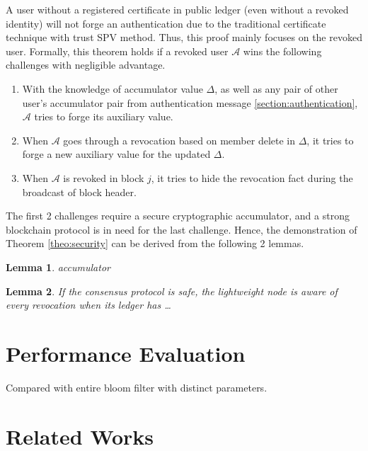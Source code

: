 \documentclass[conference]{IEEEtran}
\newtheorem{lemma}{Lemma}[theorem]
\begin{document}
\begin{IEEEproof}
    A user without a registered certificate in public ledger (even without a revoked identity) will not forge an authentication due to the traditional certificate technique with trust SPV method. Thus, this proof mainly focuses on the revoked user. Formally, this theorem holds if a revoked user $\mathcal{A}$ wins the following challenges with negligible advantage.
    \begin{enumerate}
        \item With the knowledge of accumulator value $\Delta$, as well as any pair of other user's accumulator pair from authentication message \ref{section:authentication}, $\mathcal{A}$ tries to forge its auxiliary value.
        \item When $\mathcal{A}$ goes through a revocation based on member delete in $\Delta$, it tries to forge a new auxiliary value for the updated $\Delta$.
        \item When $\mathcal{A}$ is revoked in block $j$, it tries to hide the revocation fact during the broadcast of block header.
    \end{enumerate}

    The first 2 challenges require a secure cryptographic accumulator, and a strong blockchain protocol is in need for the last challenge. Hence, the demonstration of Theorem \ref{theo:security} can be derived from the following 2 lemmas.
\end{IEEEproof}
\begin{lemma}
    accumulator
\end{lemma}

\begin{lemma}
    If the consensus protocol is safe, the lightweight node is aware of every revocation when its ledger has \dots
\end{lemma}

\section{Performance Evaluation}

Compared with entire bloom filter with distinct parameters.

\section{Related Works}




\end{document}
